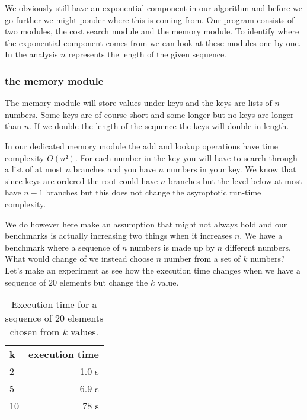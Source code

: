 \documentclass[a4paper,11pt]{article}
\begin{document}
We obviously still have an exponential component in our algorithm and
before we go further we might ponder where this is coming from. Our
program consists of two modules, the cost search module and the memory
module. To identify where the exponential component comes from we can
look at these modules one by one. In the analysis $n$ represents the
length of the given sequence. 

\subsubsection*{the memory module}

The memory module will store values under keys and the keys are lists
of $n$ numbers. Some keys are of course short and some longer but no
keys are longer than $n$. If we double the length of the sequence the
keys will double in length.

In our dedicated memory module the add and lookup operations have time
complexity $O(n²)$. For each number in the key you will have to search
through a list of at most $n$ branches and you have $n$ numbers in
your key. We know that since keys are ordered the root could have $n$
branches but the level below at most have $n-1$ branches but this does
not change the asymptotic run-time complexity.

We do however here make an assumption that might not always hold and
our benchmarks is actually increasing two things when it increases
$n$. We have a benchmark where a sequence of $n$ numbers is made up by
$n$ different numbers. What would change of we instead choose $n$
number from a set of $k$ numbers? Let's make an experiment as see how
the execution time changes when we have a sequence of $20$ elements
but change the $k$ value.

\begin{table}[h!]
  \begin{center}
    \begin{tabular}{l|r} 
      \textbf{k} & \textbf{execution time} \\
      2	 & 1.0 s\\
      5	 & 6.9 s\\
      10 & 78 s \\
    \end{tabular}
    \caption{Execution time for a sequence of 20 elements chosen from $k$ values.}
  \end{center}
\end{table}                               
\end{document}
